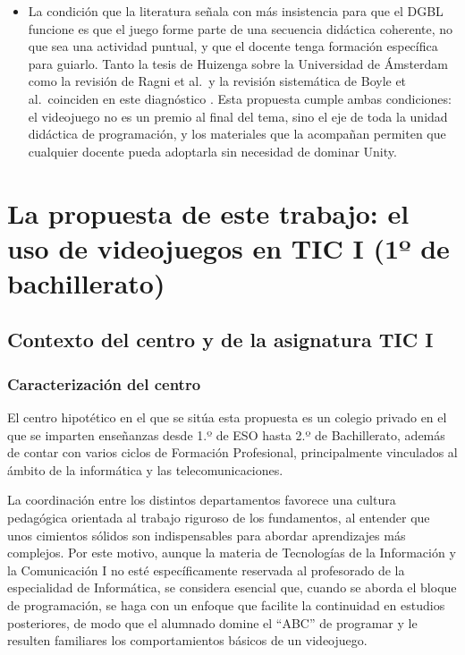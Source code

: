 \documentclass[a4paper,12pt]{article}
\begin{document}
\begin{itemize}
  \item La condición que la literatura señala con más insistencia para que el DGBL funcione es que el juego forme parte de una secuencia didáctica coherente, no que sea una actividad puntual, y que el docente tenga formación específica para guiarlo. Tanto la tesis de Huizenga sobre la Universidad de Ámsterdam como la revisión de Ragni et al.\ y la revisión sistemática de Boyle et al.\ coinciden en este diagnóstico \citep{amsterdam2017dgbl, frontiers2023dgbl, boyle2016systematic}. Esta propuesta cumple ambas condiciones: el videojuego no es un premio al final del tema, sino el eje de toda la unidad didáctica de programación, y los materiales que la acompañan permiten que cualquier docente pueda adoptarla sin necesidad de dominar Unity.
\end{itemize}

\section{La propuesta de este trabajo: el uso de videojuegos en TIC I (1º de bachillerato)}

\subsection{Contexto del centro y de la asignatura TIC I}

\subsubsection{Caracterización del centro}

El centro hipotético en el que se sitúa esta propuesta es un colegio privado en el que se imparten enseñanzas desde 1.º de ESO hasta 2.º de Bachillerato, además de contar con varios ciclos de Formación Profesional, principalmente vinculados al ámbito de la informática y las telecomunicaciones.

La coordinación entre los distintos departamentos favorece una cultura pedagógica orientada al trabajo riguroso de los fundamentos, al entender que unos cimientos sólidos son indispensables para abordar aprendizajes más complejos. Por este motivo, aunque la materia de Tecnologías de la Información y la Comunicación I no esté específicamente reservada al profesorado de la especialidad de Informática, se considera esencial que, cuando se aborda el bloque de programación, se haga con un enfoque que facilite la continuidad en estudios posteriores, de modo que el alumnado domine el “ABC” de programar y le resulten familiares los comportamientos básicos de un videojuego.
\end{document}
